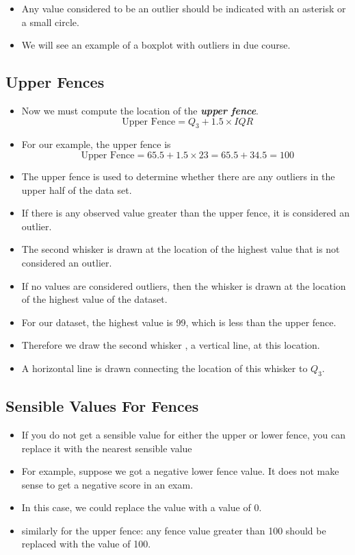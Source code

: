 \documentclass[a4paper,12pt]{article}
\begin{document}
{\begin{itemize}
\item Any value considered to be an outlier should be indicated with an asterisk or a small circle.
\item We will see an example of a boxplot with outliers in due course.
\end{itemize}

\subsection*{Upper Fences}
\begin{itemize}
\item Now we must compute the location of the \textbf{\emph{upper fence}}.
\[ \mbox{ Upper Fence}  = Q_3 + 1.5 \times IQR \]
\item For our example, the upper fence is
\[ \mbox{ Upper Fence}  = 65.5  + 1.5 \times 23  = 65.5 + 34.5 = 100 \]

\item The upper fence is used to determine whether there are any outliers in the upper half of the data set.
\item If there is any observed value greater than the upper fence, it is considered an outlier.
\item The second whisker is drawn at the location of the highest value that is not considered an outlier.
\item If no values are considered outliers, then the whisker is drawn at the location of the highest value of the dataset.
\item For our dataset, the highest value is 99, which is less than the upper fence.
\item Therefore we draw the second whisker , a vertical line, at this location.
\item A horizontal line is drawn connecting the location of this whisker to $Q_3$.
\end{itemize}

\subsection*{Sensible Values For Fences}
\begin{itemize}
\item If you do not get a sensible value for either the upper or lower fence, you can replace it with the nearest sensible value
\item For example, suppose we got a negative lower fence value. It does not make sense to get a negative score in an exam.
\item In this case, we could replace the value with a value of $0$.
\item similarly for the upper fence: any fence value greater than 100 should be replaced with the value of 100.
\end{itemize}

}
\end{document}
